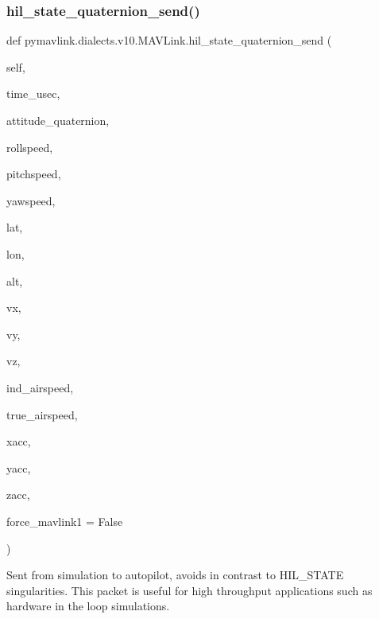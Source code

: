 \begin{DoxyVerb}
\begin{DoxyVerb}
\begin{DoxyVerb}
\begin{DoxyVerb}
\subsubsection{\texorpdfstring{hil\+\_\+state\+\_\+quaternion\+\_\+send()}{hil\_state\_quaternion\_send()}}
{\footnotesize\ttfamily def pymavlink.\+dialects.\+v10.\+M\+A\+V\+Link.\+hil\+\_\+state\+\_\+quaternion\+\_\+send (\begin{DoxyParamCaption}\item[{}]{self,  }\item[{}]{time\+\_\+usec,  }\item[{}]{attitude\+\_\+quaternion,  }\item[{}]{rollspeed,  }\item[{}]{pitchspeed,  }\item[{}]{yawspeed,  }\item[{}]{lat,  }\item[{}]{lon,  }\item[{}]{alt,  }\item[{}]{vx,  }\item[{}]{vy,  }\item[{}]{vz,  }\item[{}]{ind\+\_\+airspeed,  }\item[{}]{true\+\_\+airspeed,  }\item[{}]{xacc,  }\item[{}]{yacc,  }\item[{}]{zacc,  }\item[{}]{force\+\_\+mavlink1 = {\ttfamily False} }\end{DoxyParamCaption})}

\begin{DoxyVerb}Sent from simulation to autopilot, avoids in contrast to HIL_STATE
singularities. This packet is useful for high
throughput applications such as hardware in the loop
simulations.


\end{DoxyVerb}
\end{DoxyVerb}
\end{DoxyVerb}
\end{DoxyVerb}
\end{DoxyVerb}
